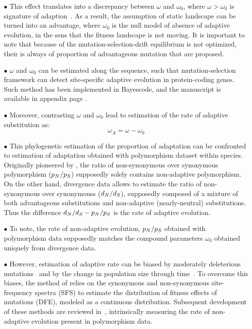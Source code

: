 $\bullet$ This effect translates into a discrepancy between $\omega$ and $\omega_0$, where $\omega > \omega_0$ is signature of adaption~\citep{Rodrigue2016}.
As a result, the assumption of static landscape can be turned into an advantage, where $\omega_0$ is the null model of absence of adaptive evolution, in the sens that the fitness landscape is not moving.
It is important to note that because of the mutation-selection-drift equilibrium is not optimized, their is always of proportion of advantageous mutation that are proposed.

$\bullet$ $\omega$ and $\omega_0$ can be estimated along the sequence, such that mutation-selection framework can detect site-specific adaptive evolution in protein-coding genes.
Such method has been implemented in Bayescode, and the manuscript is available in appendix page \pageref{sec-appendix:MutSelM3starMBE}.

$\bullet$ Moreover, contrasting $\omega$ and $\omega_0$ lead to estimation of the rate of adaptive \gls{substitution} as:
\begin{equation}
    \omega_A = \omega - \omega_0
\end{equation}

$\bullet$ This phylogenetic estimation of the proportion of adaptation can be confronted to estimation of adaptation obtained with polymorphism dataset within species.
Originally pioneered by \citet{McDonald1991}, the ratio of non-synonymous over synonymous polymorphism ($p_N / p_S$) supposedly solely contains non-adaptive polymorphism.
On the other hand, divergence data allows to estimate the ratio of non-synonymous over \glspl{synonymous} ($d_N / d_S$), supposedly composed of a mixture of both advantageous \glspl{substitution} and non-adaptive (\gls{nearly-neutral}) \glspl{substitution}.
Thus the difference $d_N / d_S - p_N / p_S $ is the rate of adaptive evolution.

$\bullet$ To note, the rate of non-adaptive evolution, $p_N / p_S$ obtained with polymorphism data supposedly matches the compound parameters $\omega_0$ obtained uniquely from divergence data.

$\bullet$ However, estimation of adaptive rate can be biased by moderately deleterious mutations~\citep{eyre-walker_quantifying_2002} and by the change in population size through time~\citep{eyre-walker_changing_2002}.
To overcome this biases, the method of \citet{Galtier2016} relies on the synonymous and non-synonymous site-frequency spectra (\acrshort{SFS}) to estimate the distribution of fitness effects of mutations (\acrshort{DFE}), modeled as a continuous distribution.
Subsequent development of these methods are reviewed in~\citep{Moutinho2019a}, intrinsically measuring the rate of non-adaptive evolution present in polymorphism data.

